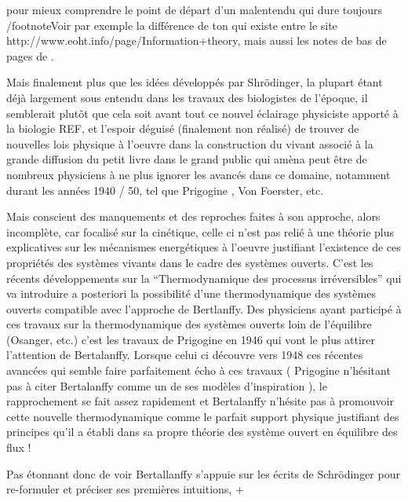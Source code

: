 \autocite{Triclot2007} pour mieux comprendre le point de départ d'un malentendu qui dure toujours /footnote{Voir par exemple la différence de ton qui existe entre le site http://www.eoht.info/page/Information+theory, mais aussi les notes de bas de pages de \autocite[277]{Lemoigne1977} }.

\autocite[482]{Pouvreau2013} Mais finalement plus que les idées développés par Shrödinger, la plupart étant déjà largement sous entendu dans les travaux des biologistes de l'époque, il semblerait plutôt que cela soit avant tout ce nouvel éclairage physiciste apporté à la biologie {REF}, et l'espoir déguisé (finalement non réalisé) de trouver de nouvelles lois physique à l'oeuvre dans la construction du vivant associé à la grande diffusion du petit livre dans le grand public qui amèna peut être de nombreux physiciens à ne plus ignorer les avancés dans ce domaine, notamment durant les années 1940 / 50, tel que Prigogine \autocite[77]{Prigogine1996}, Von Foerster, etc. \autocite[73]{Lemoigne1977}

Mais conscient des manquements et des reproches faites à son approche, alors incomplète, car focalisé sur la cinétique, celle ci n'est pas relié à une théorie plus explicatives sur les mécanismes energétiques à l'oeuvre justifiant l'existence de ces propriétés des systèmes vivants dans le cadre des systèmes ouverts. C'est les récents développements sur la \enquote{Thermodynamique des processus irréversibles} qui va introduire a posteriori la possibilité d'une thermodynamique des systèmes ouverts compatible avec l'approche de Bertlanffy. Des physiciens ayant participé à ces travaux sur la thermodynamique des systèmes ouverts loin de l'équilibre (Osanger, etc.) c'est les travaux de Prigogine  en 1946 \autocite{Prigogine1946} qui vont le plus attirer l'attention de Bertalanffy. Lorsque celui ci découvre vers 1948 ces récentes avancées qui semble faire parfaitement écho à ces travaux ( Prigogine n'hésitant pas à citer Bertalanffy comme un de ses modèles d'inspiration \autocite{Prigogine1996}), le rapprochement se fait assez rapidement et Bertalanffy n'hésite pas à promouvoir cette nouvelle thermodynamique comme le parfait support physique justifiant des principes qu'il a établi dans sa propre théorie des système ouvert en équilibre des flux ! \autocite[653-658]{Pouvreau2013}

Pas étonnant donc de voir Bertallanffy s'appuie sur les écrits de Schrödinger pour re-formuler et préciser ses premières intuitions,
+

